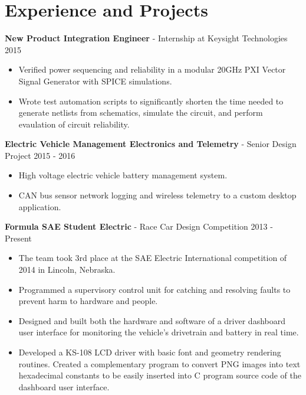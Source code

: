 \documentclass[10pt]{article}
\begin{document}
\section{Experience and Projects}
\begin{adjustwidth}{16pt}{0pt}

\noindent\textbf{New Product Integration Engineer} - Internship at Keysight Technologies
\hfill 2015
\begin{itemize}
	\setlength\itemsep{0pt}
	\item Verified power sequencing and reliability in a modular 20GHz
	PXI Vector Signal Generator with SPICE simulations.
	\item Wrote test automation scripts to significantly shorten the time needed
	to generate netlists from schematics, simulate the circuit, and perform
	evaulation of circuit reliability.
\end{itemize}


\vspace{8pt}
\noindent\textbf{Electric Vehicle Management Electronics and Telemetry} - Senior Design Project
\hfill 2015 - 2016
\begin{itemize}
	\setlength\itemsep{0pt}
	\item High voltage electric vehicle battery management system.
	\item CAN bus sensor network logging and wireless telemetry to a custom
	desktop application.
\end{itemize}



\vspace{8pt}
\noindent\textbf{Formula SAE Student Electric} - Race Car Design Competition
\hfill 2013 - Present
\begin{itemize}
	\setlength\itemsep{0pt}
	\item The team took 3rd place at the SAE Electric International competition of
	2014 in Lincoln, Nebraska.
	\item Programmed a supervisory control unit for catching and resolving faults
	to prevent harm to hardware and people.
	\item Designed and built both the hardware and software of a driver dashboard
	user interface for monitoring the vehicle's drivetrain and battery in real
	time.
	\item Developed a KS-108 LCD driver with basic font and geometry rendering
	routines. Created a complementary program to convert PNG images into text
	hexadecimal constants to be easily inserted into C program source code of the
	dashboard user interface.
\end{itemize}



\end{adjustwidth}
\end{document}

